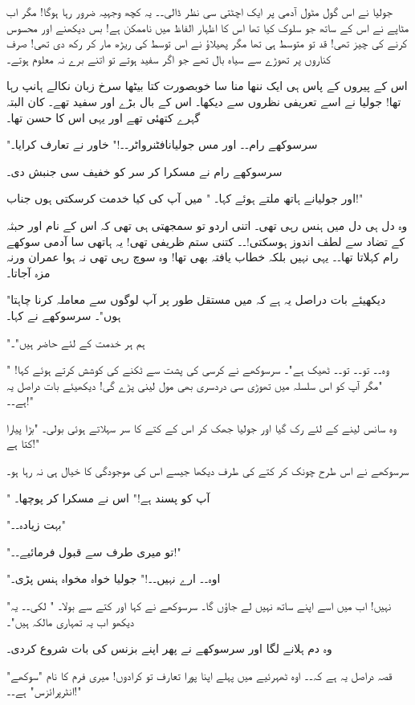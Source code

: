جولیا نے اس گول مٹول آدمی پر ایک اچٹتی سی نظر ڈالی۔۔ یہ کچھ وجہیہ ضرور رہا ہوگا! مگر اب مٹاپے نے اس کے ساتھ جو سلوک کیا تھا اس کا اظہار الفاظ میں ناممکن ہے! بس دیکھنے اور محسوس کرنے کی چیز تھی! قد تو متوسط ہی تھا مگر پھیلاؤ نے اس توسط کی ریڑھ مار کر رکھ دی تھی! صرف کناروں پر تھوڑے سے سیاہ بال تھے جو اگر سفید ہوتے تو اتنے برے نہ معلوم ہوتے۔

اس کے پیروں کے پاس ہی ایک ننھا منا سا خوبصورت کتا بیٹھا سرخ زبان نکالے ہانپ رہا تھا! جولیا نے اسے تعریفی نظروں سے دیکھا۔ اس کے بال بڑے اور سفید تھے۔ کان البتہ گہرے کتھئی تھے اور یہی اس کا حسن تھا۔

"سرسوکھے رام۔۔ اور مس جولیانافٹنرواٹر۔۔!" خاور نے تعارف کرایا۔

سرسوکھے رام نے مسکرا کر سر کو خفیف سی جنبش دی۔

اور جولیانے ہاتھ ملتے ہوئے کہا۔ " میں آپ کی کیا خدمت کرسکتی ہوں جناب!"

وہ دل ہی دل میں ہنس رہی تھی۔ اتنی اردو تو سمجھتی ہی تھی کہ اس کے نام اور حبثہ کے تضاد سے لطف اندوز ہوسکتی!۔۔ 
کتنی ستم ظریفی تھی! یہ ہاتھی سا آدمی سوکھے رام کہلاتا تھا۔۔ یہی نہیں بلکہ خطاب یافتہ بھی تھا! وہ سوچ رہی تھی نہ ہوا عمران ورنہ مزہ آجاتا۔

"دیکھیئے بات دراصل یہ ہے کہ میں مستقل طور پر آپ لوگوں سے معاملہ کرنا چاہتا ہوں"۔ سرسوکھے نے کہا۔

"ہم ہر خدمت کے لئے حاضر ہیں"۔

" وہ۔۔ تو۔۔ تو۔۔ ٹھیک ہے"۔ سرسوکھے نے کرسی کی پشت سے ٹکنے کی کوشش کرتے ہوئے کہا! "مگر آپ کو اس سلسلہ میں تھوڑی سی دردسری بھی مول لینی پڑے گی! دیکھیئے بات دراصل یہ ہے۔۔!"

وہ سانس لینے کے لئے رک گیا اور جولیا جھک کر اس کے کتے کا سر سہلاتے ہوئی بولی۔ "بڑا پیارا کتا ہے!"

سرسوکھے نے اس طرح چونک کر کتے کی طرف دیکھا جیسے اس کی موجودگی کا خیال ہی نہ رہا ہو۔

" آپ کو پسند ہے!" اس نے مسکرا کر پوچھا۔

"بہت زیادہ۔۔"

"تو میری طرف سے قبول فرمائیے۔۔!"

"اوہ۔۔ ارے نہیں۔۔!" جولیا خواہ مخواہ ہنس پڑی۔

"نہیں! اب میں اسے اپنے ساتھ نہیں لے جاؤں گا۔ سرسوکھے نے کہا اور کتے سے بولا۔ " لکی۔۔ یہ دیکھو اب یہ تمہاری مالکہ ہیں"۔

وہ دم ہلانے لگا اور سرسوکھے نے پھر اپنے بزنس کی بات شروع کردی۔

"قصہ دراصل یہ ہے کہ۔۔ اوہ ٹھہرئیے میں پہلے اپنا پورا تعارف تو کرادوں! میری فرم کا نام "سوکھے انٹرپرائزس" ہے۔۔!"


